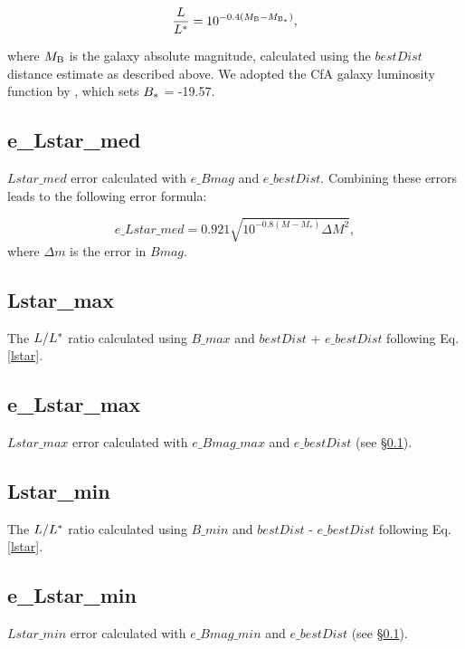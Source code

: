 \documentclass[twocolumn,tighten]{aastex62}
\begin{document}
\begin{equation}
	\frac{L}{L^{\**}} = 10^{-0.4 (M_{\rm B} - M_{\rm B_{\**}})},
	\label{lstar}
\end{equation}

\noindent where $M_{\rm B}$ is the galaxy absolute magnitude, calculated using the $bestDist$ distance estimate as described above. We adopted the CfA galaxy luminosity function by \citep{marzke1994}, which sets $B_{\**} $ = -19.57. 


\subsection{e\_Lstar\_med} \label{e_Lstar_med}
$Lstar\_med$ error calculated with $e\_Bmag$ and $e\_bestDist$. Combining these errors leads to the following error formula:

\begin{equation}
	e\_Lstar\_med = 0.921 \sqrt{10^{-0.8(M - M_*)}  \Delta M^2},
\end{equation}
\noindent where $\Delta m$ is the error in $Bmag$.



\subsection{Lstar\_max}
The $L / L^{\**}$ ratio calculated using $B\_max$ and $bestDist$ + $e\_bestDist$ following Eq. \ref{lstar}. \\


\subsection{e\_Lstar\_max}
$Lstar\_max$ error calculated with $e\_Bmag\_max$ and $e\_bestDist$ (see \S \ref{e_Lstar_med}).


\subsection{Lstar\_min}
The $L / L^{\**}$ ratio calculated using $B\_min$ and $bestDist$ - $e\_bestDist$ following Eq. \ref{lstar}.


\subsection{e\_Lstar\_min}
$Lstar\_min$ error calculated with $e\_Bmag\_min$ and $e\_bestDist$ (see \S \ref{e_Lstar_med}).
\end{document}
